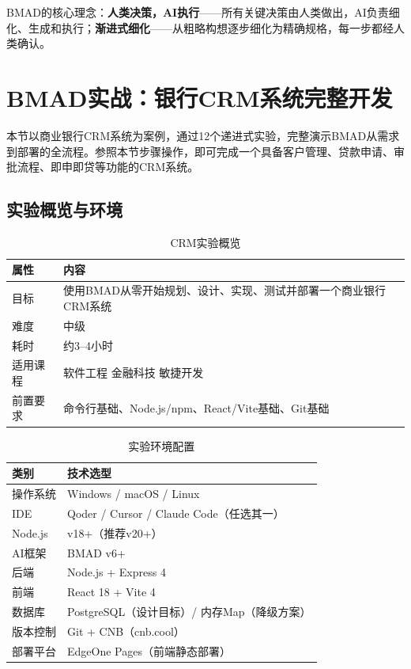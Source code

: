 BMAD的核心理念：\textbf{人类决策，AI执行}——所有关键决策由人类做出，AI负责细化、生成和执行；\textbf{渐进式细化}——从粗略构想逐步细化为精确规格，每一步都经人类确认。

\section{BMAD实战：银行CRM系统完整开发}
\label{sec:crm-practice}

本节以商业银行CRM系统为案例，通过12个递进式实验，完整演示BMAD从需求到部署的全流程。参照本节步骤操作，即可完成一个具备客户管理、贷款申请、审批流程、即申即贷等功能的CRM系统。

\subsection{实验概览与环境}

\begin{table}[H]
\centering
\begin{tabular}{ll}
\toprule
\textbf{属性} & \textbf{内容} \\
\midrule
目标 & 使用BMAD从零开始规划、设计、实现、测试并部署一个商业银行CRM系统 \\
难度 & 中级 \\
耗时 & 约3--4小时 \\
适用课程 & 软件工程 \quad 金融科技 \quad 敏捷开发 \\
前置要求 & 命令行基础、Node.js/npm、React/Vite基础、Git基础 \\
\bottomrule
\end{tabular}
\caption{CRM实验概览}
\end{table}

\begin{table}[H]
\centering
\begin{tabular}{ll}
\toprule
\textbf{类别} & \textbf{技术选型} \\
\midrule
操作系统 & Windows / macOS / Linux \\
IDE & Qoder / Cursor / Claude Code（任选其一） \\
Node.js & v18+（推荐v20+） \\
AI框架 & BMAD v6+ \\
后端 & Node.js + Express 4 \\
前端 & React 18 + Vite 4 \\
数据库 & PostgreSQL（设计目标）/ 内存Map（降级方案） \\
版本控制 & Git + CNB（cnb.cool） \\
部署平台 & EdgeOne Pages（前端静态部署） \\
\bottomrule
\end{tabular}
\caption{实验环境配置}
\end{table}

